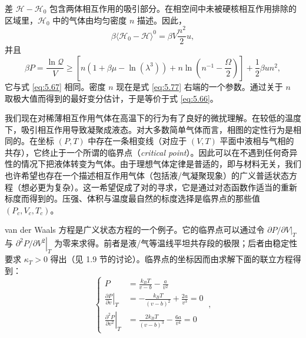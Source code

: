 
差 $\mathscr H-\mathscr H_0$ 包含两体相互作用的吸引部分。在相空间中未被硬核相互作用排除的区域里，$\mathscr H_0$ 中的气体由均匀密度 $n$ 描述。因此，
\begin{equation}\label{eq:5.76}
\beta\langle\mathscr H_0-\mathscr H\rangle^0=\beta V\frac{n^2}{2}u,
\end{equation}
并且
\begin{equation}\label{eq:5.77}
\beta P=\frac{\ln\mathcal{Q}}{V}\ge\left[n(1+\beta\mu-\ln(\lambda^3))+n\ln\left(n^{-1}-\frac{\Omega}{2}\right)\right]+\frac{1}{2}\beta un^2,
\end{equation}
它与式 \eqref{eq:5.67} 相同。密度 $n$ 现在是式 \eqref{eq:5.77} 右端的一个参数。通过关于 $n$ 取极大值而得到的最好变分估计，于是等价于式 \eqref{eq:5.66}。


我们现在对稀薄相互作用气体在高温下的行为有了良好的微扰理解。在较低的温度下，吸引相互作用导致凝聚成液态。对大多数简单气体而言，相图的定性行为是相同的。在坐标 $(P,T)$ 中存在一条相变线（对应于 $(V,T)$ 平面中液相与气相的共存），它终止于一个所谓的临界点（\textit{critical point}）。因此可以在不遇到任何奇异性的情况下把液体转变为气体。由于理想气体定律是普适的，即与材料无关，我们也许希望也存在一个描述相互作用气体（包括液/气凝聚现象）的广义普适状态方程（想必更为复杂）。这一希望促成了对的寻求，它是通过对态函数作适当的重新标度而得到的。压强、体积与温度最自然的标度选择是临界点的那些值 $(P_c,V_c,T_c)$。

van der Waals 方程是广义状态方程的一个例子。它的临界点可以通过令 $\left.\partial P/\partial V\right|_T$ 与 $\left.\partial^2P/\partial V^2\right|_T$ 为零来求得。前者是液/气等温线平坦共存段的极限；后者由稳定性要求 $\kappa_T>0$ 得出（见 1.9 节的讨论）。临界点的坐标因而由求解下面的联立方程得到：
\begin{equation}\label{eq:5.78}
\left\{
\begin{aligned}
P&=\frac{k_BT}{v-b}-\frac{a}{v^2}\\
\left.\frac{\partial P}{\partial v}\right|_T&=-\frac{k_BT}{(v-b)^2}+\frac{2a}{v^3}=0\\
\left.\frac{\partial^2P}{\partial v^2}\right|_T&=\frac{2k_BT}{(v-b)^3}-\frac{6a}{v^4}=0
\end{aligned}
\right.\ ,
\end{equation}


